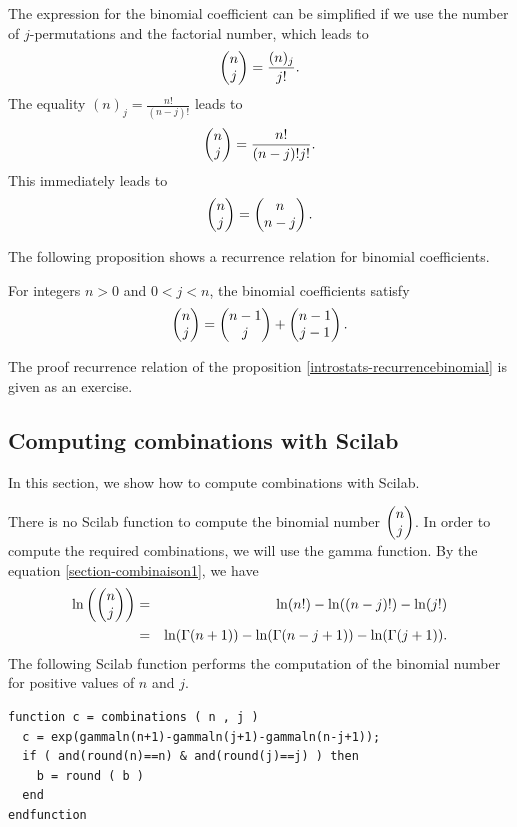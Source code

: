 The expression for the binomial coefficient can be simplified if we 
use the number of $j$-permutations and the factorial number, which leads 
to 
\begin{eqnarray}
\choosefun{n}{j} = \frac{(n)_j}{j!}.
\end{eqnarray}
The equality $(n)_j = \frac{n!}{(n-j)!}$ leads to 
\begin{eqnarray}
\choosefun{n}{j} = \frac{n!}{(n-j)!j!}. \label{section-combinaison1}
\end{eqnarray}
This immediately leads to 
\begin{eqnarray}
\choosefun{n}{j} = \choosefun{n}{n-j}.
\end{eqnarray}

The following proposition shows a recurrence relation for 
binomial coefficients.

\begin{proposition}
\label{introstats-recurrencebinomial}
For integers $n>0$ and $0<j<n$, the binomial coefficients satisfy
\begin{eqnarray}
\choosefun{n}{j} = \choosefun{n-1}{j} + \choosefun{n-1}{j-1}.
\end{eqnarray}
\end{proposition}

The proof recurrence relation of the proposition \ref{introstats-recurrencebinomial}
is given as an exercise.

\subsection{Computing combinations with Scilab}
\label{introstats-computingcombinations}
In this section, we show how to compute combinations with 
Scilab. 

There is no Scilab function to compute the binomial number 
$\choosefun{n}{j}$. 
In order to compute the required combinations, we will use 
the gamma function. By the equation \ref{section-combinaison1}, 
we have
\begin{eqnarray}
\ln\left( \choosefun{n}{j} \right)
&=& \ln(n!)- \ln((n-j)!) - \ln(j!) \\
&=& \ln(\Gamma(n+1))- \ln(\Gamma(n-j+1)) - \ln(\Gamma(j+1)).
\end{eqnarray}
The following Scilab function performs 
the computation of the binomial number for positive values of $n$ and $j$.
\lstset{language=scilabscript}
\begin{lstlisting}
function c = combinations ( n , j )
  c = exp(gammaln(n+1)-gammaln(j+1)-gammaln(n-j+1));
  if ( and(round(n)==n) & and(round(j)==j) ) then
    b = round ( b )
  end
endfunction
\end{lstlisting}

